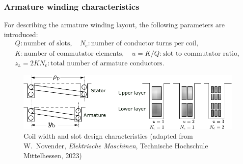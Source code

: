 \begin{frame}
	\frametitle{Armature winding characteristics}
	For describing the armature winding layout, the following parameters are introduced:
	\begin{gather*}
		Q: \mbox{number of slots}, \quad N_\mathrm{c}: \mbox{number of conductor turns per coil}, \\ K: \mbox{number of commutator elements}, \quad u = K/Q: \mbox{slot to commutator ratio}, \\z_\mathrm{a} = 2 K N_\mathrm{c}: \mbox{total number of armature conductors}.
	\end{gather*}
    \begin{figure}
        \centering
        \includegraphics[height=0.35\textheight]{fig/lec03/Lap_winding_characteristics.pdf}
        \caption{Coil width and slot design characteristics (adapted from W.~Novender, \textit{Elektrische Maschinen}, Technische Hochschule Mittelhessen, 2023)}
		\label{fig:Lap_winding_characteristics}
    \end{figure}
\end{frame}

